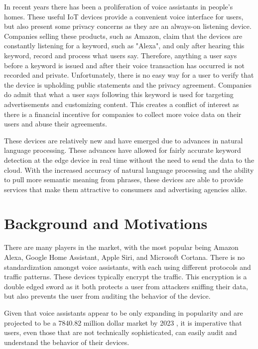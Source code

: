 \documentclass[letterpaper,twocolumn,10pt]{article}
\begin{document}
In recent years there has been a proliferation of voice assistants in people’s homes. 
These useful IoT devices provide a convenient voice interface for users, but also present some privacy concerns as they are an always-on listening device. 
Companies selling these products, such as Amazon, claim that the devices are constantly listening for a keyword, such as "Alexa", and only after hearing this keyword, record and process what users say. 
Therefore, anything a user says before a keyword is issued and after their voice transaction has occurred is not recorded and private. 
Unfortunately, there is no easy way for a user to verify that the device is upholding public statements and the privacy agreement. 
Companies do admit that what a user says following this keyword is used for targeting advertisements and customizing content. 
This creates a conflict of interest as there is a financial incentive for companies to collect more voice data on their users and abuse their agreements.

These devices are relatively new and have emerged due to advances in natural language processing. 
These advances have allowed for fairly accurate keyword detection at the edge device in real time without the need to send the data to the cloud. 
With the increased accuracy of natural language processing and the ability to pull more semantic meaning from phrases, these devices are able to provide services that make them attractive to consumers and advertising agencies alike.

\section{Background and Motivations}

There are many players in the market, with the most popular being Amazon Alexa, Google Home Assistant, Apple Siri, and Microsoft Cortana. 
There is no standardization amongst voice assistants, with each using different protocols and traffic patterns. 
These devices typically encrypt the traffic. This encryption is a double edged sword as it both protects a user from attackers sniffing their data, but also prevents the user from auditing the behavior of the device. 

Given that voice assistants appear to be only expanding in popularity and are projected to be a 7840.82 million dollar market by 2023 \cite{market_reports}, it is imperative that users, even those that are not technically sophisticated, can easily audit and understand the behavior of their devices.
\end{document}
